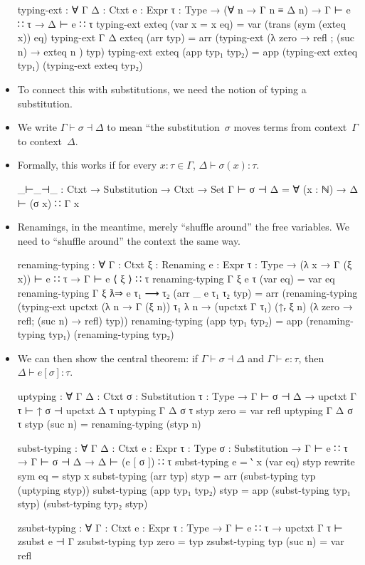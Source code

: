 \documentclass{lecturenotes}
\begin{document}
\begin{itemize}
\begin{code}
typing-ext : ∀ {Γ Δ : Ctxt} {e : Expr} {τ : Type} →
  (∀ n → Γ n ≡ Δ n) →
  Γ ⊢ e ∷ τ →
  Δ ⊢ e ∷ τ
typing-ext exteq (var {x = x} eq) = var (trans (sym (exteq x)) eq)
typing-ext {Γ} {Δ} exteq (arr typ) =
  arr (typing-ext (λ {zero → refl ; (suc n) → exteq n }) typ)
typing-ext exteq (app typ₁ typ₂) =
  app (typing-ext exteq typ₁) (typing-ext exteq typ₂)
\end{code}
\item To connect this with substitutions, we need the notion of typing a substitution.
\item We write $\Gamma \vdash \sigma \dashv \Delta$ to mean ``the substitution~$\sigma$ moves terms from context~$\Gamma$ to context~$\Delta$.
\item Formally, this works if for every $x \colon \tau \in \Gamma$, $\Delta \vdash \sigma(x) \colon \tau$.
\begin{code}
_⊢_⊣_ : Ctxt → Substitution → Ctxt → Set
Γ ⊢ σ ⊣ Δ = ∀ (x : ℕ) → Δ ⊢ (σ x) ∷ Γ x
\end{code}
\item Renamings, in the meantime, merely ``shuffle around'' the free variables.
  We need to ``shuffle around'' the context the same way.
\begin{code}
renaming-typing : ∀ {Γ : Ctxt} {ξ : Renaming} {e : Expr} {τ : Type} →
  (λ x → Γ (ξ x)) ⊢ e ∷ τ → Γ ⊢ e ⟨ ξ ⟩ ∷ τ
renaming-typing {Γ} {ξ} {e} {τ} (var eq) = var eq
renaming-typing {Γ} {ξ} {ƛ⇒ e} {τ₁ ⟶ τ₂} (arr {_} {e} {τ₁} {τ₂} typ) =
  arr (renaming-typing
        (typing-ext {upctxt (λ n → Γ (ξ n)) τ₁}
                    {λ n → (upctxt Γ τ₁) (↑ᵣ ξ n)}
                    (λ {zero → refl; (suc n) → refl})
                    typ))
renaming-typing (app typ₁ typ₂) = app (renaming-typing typ₁) (renaming-typing typ₂)
\end{code}
\newpage
\item We can then show the central theorem: if $\Gamma \vdash \sigma \dashv \Delta$ and $\Gamma \vdash e \colon \tau$, then $\Delta \vdash e[\sigma] \colon \tau$.
\begin{code}
uptyping : ∀ {Γ Δ : Ctxt} {σ : Substitution} {τ : Type} →
  Γ ⊢ σ ⊣ Δ → upctxt Γ τ ⊢ ↑ σ ⊣ upctxt Δ τ
uptyping {Γ} {Δ} {σ} {τ} styp zero = var refl
uptyping {Γ} {Δ} {σ} {τ} styp (suc n) = renaming-typing (styp n)

subst-typing : ∀ {Γ Δ : Ctxt} {e : Expr} {τ : Type} {σ : Substitution} →
  Γ ⊢ e ∷ τ → Γ ⊢ σ ⊣ Δ → Δ ⊢ (e [ σ ]) ∷ τ
subst-typing {e = ‵ x} (var eq) styp rewrite sym eq = styp x
subst-typing (arr typ) styp =
  arr (subst-typing typ (uptyping styp))
subst-typing (app typ₁ typ₂) styp =
  app (subst-typing typ₁ styp) (subst-typing typ₂ styp)

zsubst-typing : ∀ {Γ : Ctxt} {e : Expr} {τ : Type} →
  Γ ⊢ e ∷ τ →
  upctxt Γ τ ⊢ zsubst e ⊣ Γ
zsubst-typing typ zero = typ
zsubst-typing typ (suc n) = var refl
\end{code}
\end{itemize}
\end{document}
